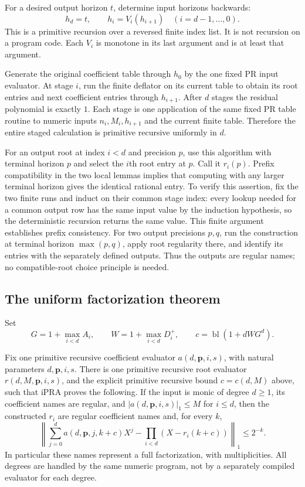 For a desired output horizon $t$, determine input horizons backwards:
\[
 h_d=t,\qquad h_i=V_i(h_{i+1})\quad(i=d-1,\ldots,0).
 \tag{F14}\label{eq:fta-backwards}
\]
This is a primitive recursion over a reversed finite index list.  It is
not recursion on a program code.  Each $V_i$ is monotone in its last
argument and is at least that argument.

Generate the original coefficient table through $h_0$ by the one fixed
PR input evaluator.  At stage $i$, run the finite deflator on its current
table to obtain its root entries and next coefficient entries through
$h_{i+1}$.  After $d$ stages the residual polynomial is exactly $1$.
Each stage is one application of the same fixed PR table routine to
numeric inputs $n_i,M_i,h_{i+1}$ and the current finite table.  Therefore
the entire staged calculation is primitive recursive uniformly in $d$.

For an output root at index $i<d$ and precision $p$, use this algorithm
with terminal horizon $p$ and select the $i$th root entry at $p$.
Call it $r_i(p)$.  Prefix compatibility in the two local lemmas implies
that computing with any larger terminal horizon gives the identical
rational entry.  To verify this assertion, fix the two finite runs and
induct on their common stage index: every lookup needed for a common
output row has the same input value by the induction hypothesis, so the
deterministic recursion returns the same value.  This finite argument establishes prefix consistency. For two output
precisions $p,q$, run the construction at terminal horizon $\max(p,q)$,
apply root regularity there, and identify its entries with the separately
defined outputs. Thus the outputs are regular names; no compatible-root
choice principle is needed.

\subsection{The uniform factorization theorem}

Set
\[
 G=1+\max_{i<d}A_i,\qquad
 W=1+\max_{i<d}D_i^+,\qquad
 c=\operatorname{bl}(1+dWG^d).
 \tag{F15}\label{eq:fta-final-budget}
\]

\begin{theorem}
\label{thm:fta-uniform-factorization}
Fix one primitive recursive coefficient evaluator
$a(d,\mathbf p,i,s)$, with natural parameters $d,\mathbf p,i,s$.
There is one primitive recursive root evaluator
$r(d,M,\mathbf p,i,s)$, and the explicit primitive recursive bound
$c=c(d,M)$ above, such that iPRA proves the following.
If the input is monic of degree $d\ge1$, its coefficient names are
regular, and $|a(d,\mathbf p,i,s)|_1\le M$ for $i\le d$, then the
constructed $r_i$ are regular coefficient names and, for every $k$,
\[
 \left\|
   \sum_{j=0}^d a(d,\mathbf p,j,k+c)X^j
       -\prod_{i<d}(X-r_i(k+c))
 \right\|_1\le2^{-k}.
 \tag{F16}\label{eq:fta-uniform-factorization}
\]
In particular these names represent a full factorization, with
multiplicities.  All degrees are handled by the same numeric program,
not by a separately compiled evaluator for each degree.
\end{theorem}

